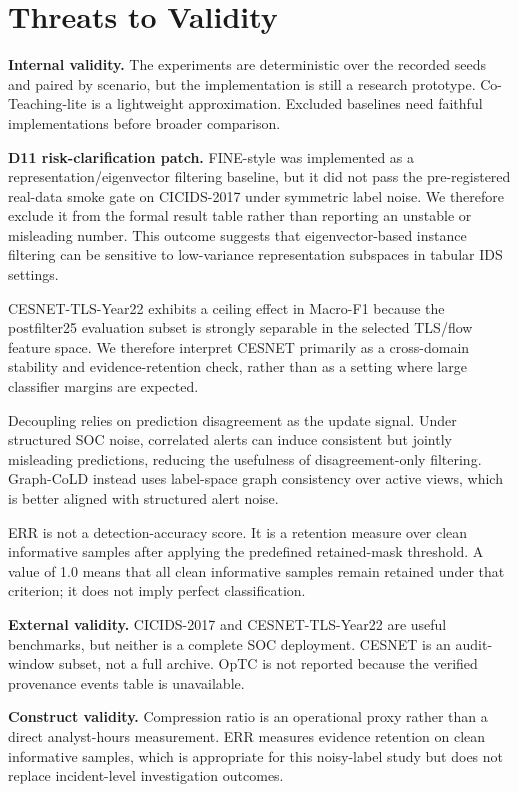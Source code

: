 \documentclass[preprint,review,12pt]{elsarticle}
\begin{document}
\section{Threats to Validity}
\textbf{Internal validity.} The experiments are deterministic over the recorded
seeds and paired by scenario, but the implementation is still a research
prototype. Co-Teaching-lite is a lightweight approximation. Excluded baselines need
faithful implementations before broader comparison.

\textbf{D11 risk-clarification patch.} FINE-style was implemented as a representation/eigenvector filtering baseline, but it did not pass the pre-registered real-data smoke gate on CICIDS-2017 under symmetric label noise. We therefore exclude it from the formal result table rather than reporting an unstable or misleading number. This outcome suggests that eigenvector-based instance filtering can be sensitive to low-variance representation subspaces in tabular IDS settings.

CESNET-TLS-Year22 exhibits a ceiling effect in Macro-F1 because the postfilter25 evaluation subset is strongly separable in the selected TLS/flow feature space. We therefore interpret CESNET primarily as a cross-domain stability and evidence-retention check, rather than as a setting where large classifier margins are expected.

Decoupling relies on prediction disagreement as the update signal. Under structured SOC noise, correlated alerts can induce consistent but jointly misleading predictions, reducing the usefulness of disagreement-only filtering. Graph-CoLD instead uses label-space graph consistency over active views, which is better aligned with structured alert noise.

ERR is not a detection-accuracy score. It is a retention measure over clean informative samples after applying the predefined retained-mask threshold. A value of 1.0 means that all clean informative samples remain retained under that criterion; it does not imply perfect classification.

\textbf{External validity.} CICIDS-2017 and CESNET-TLS-Year22 are useful
benchmarks, but neither is a complete SOC deployment. CESNET is an audit-window
subset, not a full archive. OpTC is not reported because the verified provenance
events table is unavailable.

\textbf{Construct validity.} Compression ratio is an operational proxy rather
than a direct analyst-hours measurement. ERR measures evidence retention on clean
informative samples, which is appropriate for this noisy-label study but does
not replace incident-level investigation outcomes.
\end{document}
